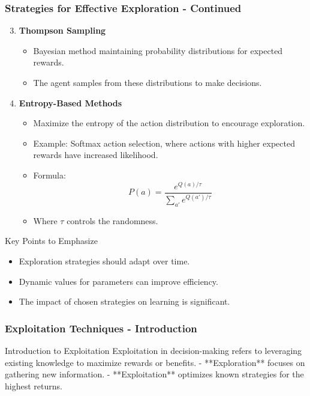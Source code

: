 \documentclass[aspectratio=169]{beamer}
\begin{document}
\begin{frame}[fragile]
    \frametitle{Strategies for Effective Exploration - Continued}
    \begin{enumerate}
        \setcounter{enumi}{2} %
        \item \textbf{Thompson Sampling}
        \begin{itemize}
            \item Bayesian method maintaining probability distributions for expected rewards.
            \item The agent samples from these distributions to make decisions.
        \end{itemize}
        
        \item \textbf{Entropy-Based Methods}
        \begin{itemize}
            \item Maximize the entropy of the action distribution to encourage exploration.
            \item Example: Softmax action selection, where actions with higher expected rewards have increased likelihood.
            \item Formula:
            \begin{equation}
                P(a) = \frac{e^{Q(a)/\tau}}{\sum_{a'} e^{Q(a')/\tau}}
            \end{equation}
            \item Where \( \tau \) controls the randomness.
        \end{itemize}
    \end{enumerate}

    \begin{block}{Key Points to Emphasize}
        \begin{itemize}
            \item Exploration strategies should adapt over time.
            \item Dynamic values for parameters can improve efficiency.
            \item The impact of chosen strategies on learning is significant.
        \end{itemize}
    \end{block}
\end{frame}

\begin{frame}[fragile]
    \frametitle{Exploitation Techniques - Introduction}
    \begin{block}{Introduction to Exploitation}
        Exploitation in decision-making refers to leveraging existing knowledge to maximize rewards or benefits. 
        - **Exploration** focuses on gathering new information.
        - **Exploitation** optimizes known strategies for the highest returns.
    \end{block}
\end{frame}
\end{document}
